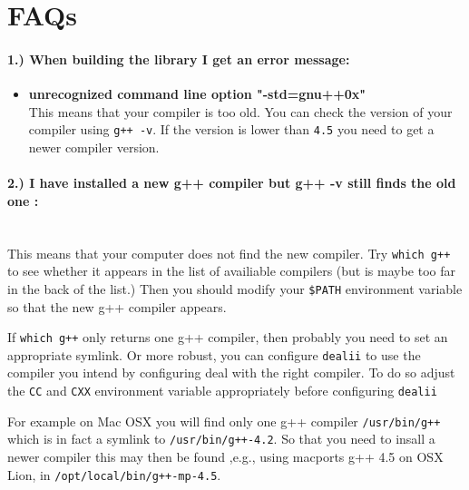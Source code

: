 \section{FAQs}
\paragraph{1.) When building the library I get an error message:}
\begin{itemize}
\item {\bf unrecognized command line option "-std=gnu++0x"}\\
  This means that your compiler is too old. You can check the 
  version of your compiler using \texttt{g++ -v}. If the version is lower than
  \texttt{4.5} you need to get a newer compiler version.
\end{itemize}

\paragraph{2.) I have installed a new g++ compiler but g++ -v still finds the old one :}
\ \\
  This means that your computer does not find the new compiler. Try
  \texttt{which g++} to see whether it appears in the list of availiable 
  compilers (but is maybe too far in the back of the list.) Then you should 
  modify your \texttt{\$PATH} environment variable so that the new g++ compiler
  appears.

  If \texttt{which g++} only returns one g++ compiler, then probably you need to
  set an appropriate symlink. Or more robust, you can configure \texttt{dealii}
  to use the compiler you intend by configuring deal with the right compiler. To
  do so adjust  the \texttt{CC} and \texttt{CXX} environment variable appropriately
  before configuring \texttt{dealii}
  
  For example on Mac OSX you will find only one g++ compiler \texttt{/usr/bin/g++}
  which is in fact a symlink to \texttt{/usr/bin/g++-4.2}. 
  So that you need to insall a newer compiler this may then be found ,e.g., using macports 
  g++ 4.5 on OSX Lion, in \texttt{/opt/local/bin/g++-mp-4.5}. 

